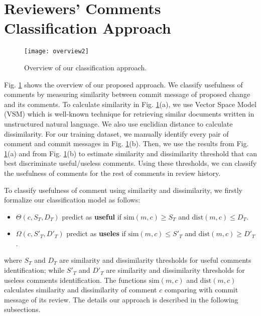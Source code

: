 
\section{Reviewers' Comments Classification Approach}
\begin{figure}[!t]
\centering
\texttt{[image: overview2]}
\caption{Overview of our classification approach.}
\label{fig:overview}
\end{figure}

Fig. \ref{fig:overview} shows the overview of our proposed approach. We classify usefulness of comments by measuring similarity between commit message of proposed change and its comments. To calculate similarity in Fig. \ref{fig:overview}(a), we use Vector Space Model (VSM) which is well-known technique for retrieving similar documents written in unstructured natural language. We also use euclidian distance to calculate dissimilarity. For our training dataset, we manually identify every pair of comment and commit messages in Fig. \ref{fig:overview}(b). Then, we use the results from Fig. \ref{fig:overview}(a) and from Fig. \ref{fig:overview}(b) to estimate similarity and dissimilarity threshold that can best discriminate useful/useless comments. Using these thresholds, we can classify the usefulness of comments for the rest of comments in review history. 

To classify usefulness of comment using similarity and dissimilarity, we firstly formalize our classification model as follows:
\begin{itemize}
\item $\Theta(c,S_T,D_T)$ predict as \textbf{useful} if $\mathrm{sim}(m,c) \geq S_T$ and $\mathrm{dist}(m,c) \leq D_T$.
\item $\Omega(c,S'_T,D'_T)$ predict as \textbf{useles} if $\mathrm{sim}(m,c) \leq  S'_T$ and $\mathrm{dist}(m,c) \geq D'_T$.
\end{itemize}
where $S_T$ and $D_T$ are similarity and dissimilarity thresholds for useful comments identification; while $S'_T$ and $D'_T$ are similarity and dissimilarity thresholds for useless comments identification. The functions $\mathrm{sim}(m,c)$ and $\mathrm{dist}(m,c)$ calculates similarity and dissimilarity of comment $c$ comparing with commit message of its review. The details our approach is described in the following subsections.


